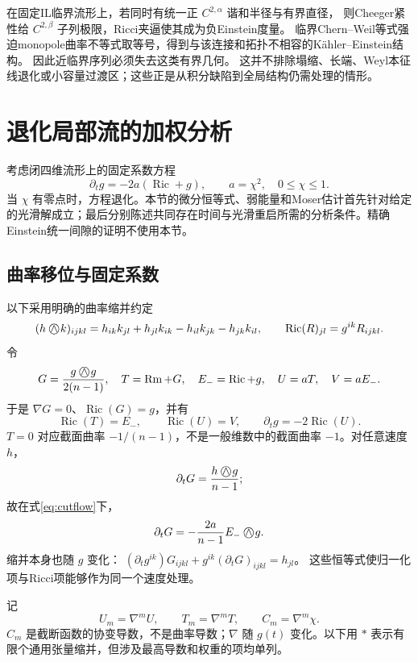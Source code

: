 \documentclass[UTF8,a4paper,11pt,fontset=fandol]{ctexart}
\numberwithin{equation}{section}
\theoremstyle{definition}
\newcommand{\Ric}{\operatorname{Ric}}
\newcommand{\Rm}{\operatorname{Rm}}
\newcommand{\owedge}{\mathbin{\bigcirc\mkern-15mu\wedge}}
\begin{document}
在固定IL临界流形上，若同时有统一正 $C^{2,\alpha}$ 谐和半径与有界直径，
则Cheeger紧性给 $C^{2,\beta}$ 子列极限，Ricci夹逼使其成为负Einstein度量。
临界Chern--Weil等式强迫monopole曲率不等式取等号，得到与该连接和拓扑不相容的K\"ahler--Einstein结构。
因此近临界序列必须失去这类有界几何。
这并不排除塌缩、长端、Weyl本征线退化或小容量过渡区；这些正是从积分缺陷到全局结构仍需处理的情形。


\appendix
\section{退化局部流的加权分析}\label{app:flow}
考虑闭四维流形上的固定系数方程
\begin{equation}\label{eq:cutflow}
\partial_tg=-2a(\Ric+g),\qquad a=\chi^2,\quad 0\le\chi\le1.
\end{equation}
当 $\chi$ 有零点时，方程退化。本节的微分恒等式、弱能量和Moser估计首先针对给定的光滑解成立；最后分别陈述共同存在时间与光滑重启所需的分析条件。精确Einstein统一间隙的证明不使用本节。

\subsection{曲率移位与固定系数}
以下采用明确的曲率缩并约定
\[
(h\owedge k)_{ijkl}=h_{ik}k_{jl}+h_{jl}k_{ik}-h_{il}k_{jk}-h_{jk}k_{il},
\qquad \Ric(R)_{jl}=g^{ik}R_{ijkl}.
\]
令
\[
G=\frac{g\owedge g}{2(n-1)},\quad T=\Rm+G,\quad
E_-=\Ric+g,\quad U=aT,\quad V=aE_-.
\]
于是 $\nabla G=0$、$\Ric(G)=g$，并有
\begin{equation}\label{eq:shift-contract}
\Ric(T)=E_-,\qquad \Ric(U)=V,\qquad \partial_tg=-2\Ric(U).
\end{equation}
$T=0$ 对应截面曲率 $-1/(n-1)$，不是一般维数中的截面曲率 $-1$。对任意速度 $h$，
\[
\partial_tG=\frac{h\owedge g}{n-1};
\]
故在式\eqref{eq:cutflow}下，
\[
\partial_tG=-\frac{2a}{n-1}E_-\owedge g.
\]
缩并本身也随 $g$ 变化：
$(\partial_tg^{ik})G_{ijkl}+g^{ik}(\partial_tG)_{ijkl}=h_{jl}$。
这些恒等式使归一化项与Ricci项能够作为同一个速度处理。

记
\[
U_m=\nabla^mU,\qquad T_m=\nabla^mT,\qquad C_m=\nabla^m\chi.
\]
$C_m$ 是截断函数的协变导数，不是曲率导数；$\nabla$ 随 $g(t)$ 变化。以下用 $*$ 表示有限个通用张量缩并，但涉及最高导数和权重的项均单列。
\end{document}
